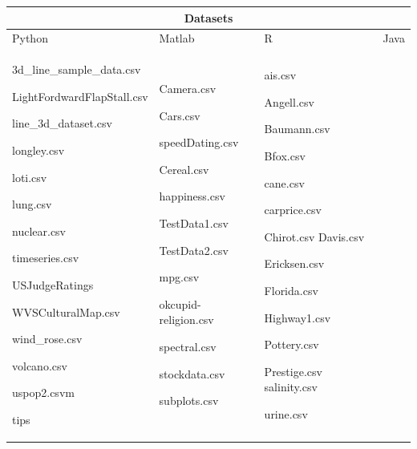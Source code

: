 \documentclass[12pt, a4paper,oneside]{report}
\begin{document}
\begin{table}[h]
	\centering {} \small
	\begin{tabular}{|p{5cm}|p{3cm}|p{3cm}|p{4cm}|}
		
		 \hline
		 \multicolumn{4}{|c|}{Datasets} \\
		 \hline
				
		Python & Matlab & R  & Java\\ \hline
		
		3d\_line\_sample\_data.csv \par LightFordwardFlapStall.csv  \par line\_3d\_dataset.csv \par
		longley.csv  \par loti.csv  \par lung.csv  \par nuclear.csv  \par timeseries.csv  \par
		USJudgeRatings	\par WVSCulturalMap.csv  \par wind\_rose.csv  \par volcano.csv  \par uspop2.csvm \par tips &
		
		Camera.csv \par Cars.csv \par speedDating.csv \par Cereal.csv  \par happiness.csv \par TestData1.csv \par TestData2.csv  \par mpg.csv \par okcupid-religion.csv  \par spectral.csv
		\par stockdata.csv \par subplots.csv  & 
		
		ais.csv \par Angell.csv  \par Baumann.csv \par Bfox.csv \par cane.csv \par carprice.csv \par Chirot.csv
		Davis.csv \par Ericksen.csv \par Florida.csv \par Highway1.csv \par Pottery.csv \par Prestige.csv 
		salinity.csv \par urine.csv & 
		

\end{tabular}
\end{table}
\end{document}
